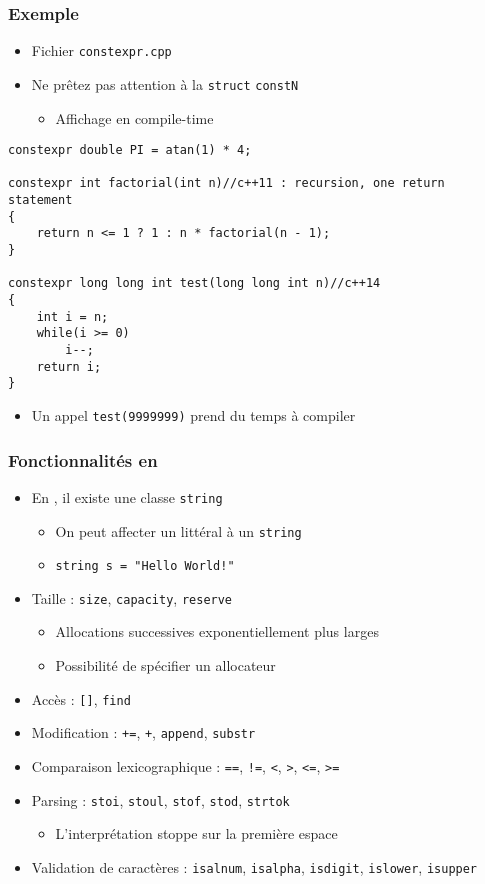 \begin{frame}[containsverbatim]
\frametitle{Exemple}
\begin{itemize}
\item Fichier \texttt{constexpr.cpp}
\item Ne prêtez pas attention à la \lstinline|struct| \texttt{constN}
	\begin{itemize}
	\item Affichage en compile-time
	\end{itemize}
\end{itemize}
\begin{lstlisting}
constexpr double PI = atan(1) * 4;

constexpr int factorial(int n)//c++11 : recursion, one return statement
{
    return n <= 1 ? 1 : n * factorial(n - 1);
}

constexpr long long int test(long long int n)//c++14
{
	int i = n;
	while(i >= 0)
		i--;
	return i;
}
\end{lstlisting}
\begin{itemize}
\item Un appel \texttt{test(9999999)} prend du temps à compiler
\end{itemize}
\end{frame}

\begin{frame}
\frametitle{Fonctionnalités en \cpp}
\begin{itemize}[<+->]
\item En \cpp, il existe une classe \texttt{string}
	\begin{itemize}
	\item On peut affecter un littéral à un \texttt{string}
	\item \lstinline|string s = "Hello World!"|
	\end{itemize}
\item Taille : \texttt{size}, \texttt{capacity}, \texttt{reserve}
	\begin{itemize}
	\item Allocations successives exponentiellement plus larges
	\item Possibilité de spécifier un allocateur
	\end{itemize}
\item Accès : \texttt{[]}, \texttt{find}
\item Modification : \texttt{+=}, \texttt{+}, \texttt{append}, \texttt{substr}
\item Comparaison lexicographique : \texttt{==}, \texttt{!=}, \texttt{<}, \texttt{>}, \texttt{<=}, \texttt{>=}
\item Parsing : \texttt{stoi}, \texttt{stoul}, \texttt{stof}, \texttt{stod}, \texttt{strtok}
	\begin{itemize}
	\item L'interprétation stoppe sur la première espace
	\end{itemize}
\item Validation de caractères : \texttt{isalnum}, \texttt{isalpha}, \texttt{isdigit}, \texttt{islower}, \texttt{isupper}
\end{itemize}
\end{frame}

